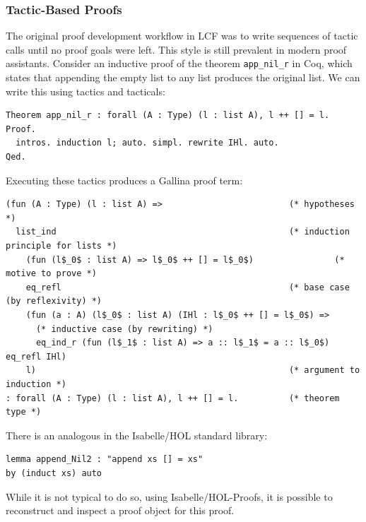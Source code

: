 \subsubsection{Tactic-Based Proofs}

The original proof development workflow in LCF was to write sequences of tactic calls until no proof goals were left. This style is still prevalent in modern proof assistants.
%
Consider an inductive proof of the theorem \lstinline{app_nil_r} in Coq,
which states that appending the empty list to any list produces the original
list. We can write this using tactics and tacticals:
\begin{lstlisting}
Theorem app_nil_r : forall (A : Type) (l : list A), l ++ [] = l.
Proof.
  intros. induction l; auto. simpl. rewrite IHl. auto.
Qed.
\end{lstlisting}
Executing these tactics produces a Gallina proof term:
\begin{lstlisting}
(fun (A : Type) (l : list A) =>                         (* hypotheses *)
  list_ind                                              (* induction principle for lists *)
    (fun (l$_0$ : list A) => l$_0$ ++ [] = l$_0$)                (* motive to prove *)
    eq_refl                                             (* base case (by reflexivity) *)
    (fun (a : A) (l$_0$ : list A) (IHl : l$_0$ ++ [] = l$_0$) => 
      (* inductive case (by rewriting) *)
      eq_ind_r (fun (l$_1$ : list A) => a :: l$_1$ = a :: l$_0$) eq_refl IHl)
    l)                                                  (* argument to induction *)
: forall (A : Type) (l : list A), l ++ [] = l.          (* theorem type *)
\end{lstlisting}

There is an analogous in the Isabelle/HOL standard library:
\begin{lstlisting}
lemma append_Nil2 : "append xs [] = xs"
by (induct xs) auto
\end{lstlisting}
While it is not typical to do so, using Isabelle/HOL-Proofs, it is possible to reconstruct and inspect a proof object
for this proof.

